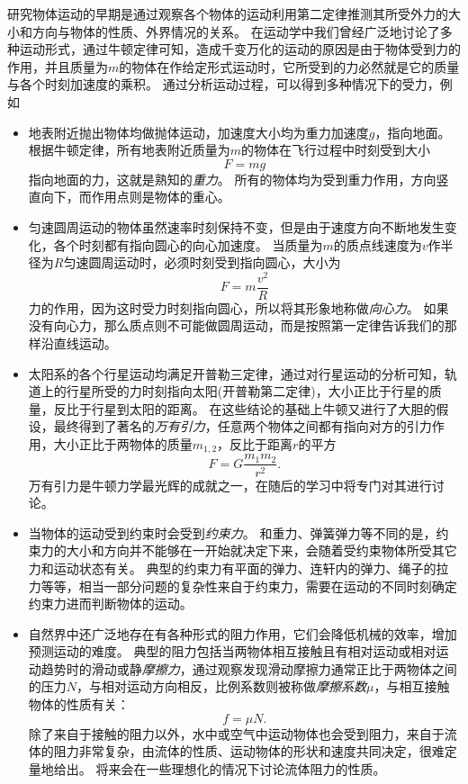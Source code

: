 研究物体运动的早期是通过观察各个物体的运动利用第二定律推测其所受外力的大小和方向与物体的性质、外界情况的关系。
在运动学中我们曾经广泛地讨论了多种运动形式，通过牛顿定律可知，造成千变万化的运动的原因是由于物体受到力的作用，并且质量为$m$的物体在作给定形式运动时，它所受到的力必然就是它的质量与各个时刻加速度的乘积。
通过分析运动过程，可以得到多种情况下的受力，例如
\begin{itemize}
\item
地表附近抛出物体均做抛体运动，加速度大小均为重力加速度$g$，指向地面。
根据牛顿定律，所有地表附近质量为$m$的物体在飞行过程中时刻受到大小
\begin{equation}
F = mg
\end{equation}\label{eqn: motion-f=mg}
指向地面的力，这就是熟知的\emph{重力}。
所有的物体均为受到重力作用，方向竖直向下，而作用点则是物体的重心。
\item
匀速圆周运动的物体虽然速率时刻保持不变，但是由于速度方向不断地发生变化，各个时刻都有指向圆心的向心加速度。
当质量为$m$的质点线速度为$v$作半径为$R$匀速圆周运动时，必须时刻受到指向圆心，大小为
\begin{equation}
F = m \frac{v^2}{R}
\end{equation}
力的作用，因为这时受力时刻指向圆心，所以将其形象地称做\emph{向心力}。
如果没有向心力，那么质点则不可能做圆周运动，而是按照第一定律告诉我们的那样沿直线运动。

\item
太阳系的各个行星运动均满足开普勒三定律，通过对行星运动的分析可知，轨道上的行星所受的力时刻指向太阳(开普勒第二定律)，大小正比于行星的质量，反比于行星到太阳的距离。
在这些结论的基础上牛顿又进行了大胆的假设，最终得到了著名的\emph{万有引力}，任意两个物体之间都有指向对方的引力作用，大小正比于两物体的质量$m_{1,2}$，反比于距离$r$的平方
\begin{equation}
F = G \frac{m_1m_2}{r^2}.
\end{equation}
万有引力是牛顿力学最光辉的成就之一，在随后的学习中将专门对其进行讨论。
\item
当物体的运动受到约束时会受到\emph{约束力}。
和重力、弹簧弹力等不同的是，约束力的大小和方向并不能够在一开始就决定下来，会随着受约束物体所受其它力和运动状态有关。
典型的约束力有平面的弹力、连轩内的弹力、绳子的拉力等等，相当一部分问题的复杂性来自于约束力，需要在运动的不同时刻确定约束力进而判断物体的运动。
\item
自然界中还广泛地存在有各种形式的阻力作用，它们会降低机械的效率，增加预测运动的难度。
典型的阻力包括当两物体相互接触且有相对运动或相对运动趋势时的滑动或静\emph{摩擦力}，通过观察发现滑动摩擦力通常正比于两物体之间的压力$N$，与相对运动方向相反，比例系数则被称做\emph{摩擦系数$\mu$}，与相互接触物体的性质有关：
\begin{equation}
f = \mu N.
\end{equation}
除了来自于接触的阻力以外，水中或空气中运动物体也会受到阻力，来自于流体的阻力非常复杂，由流体的性质、运动物体的形状和速度共同决定，很难定量地给出。
将来会在一些理想化的情况下讨论流体阻力的性质。
\end{itemize}


